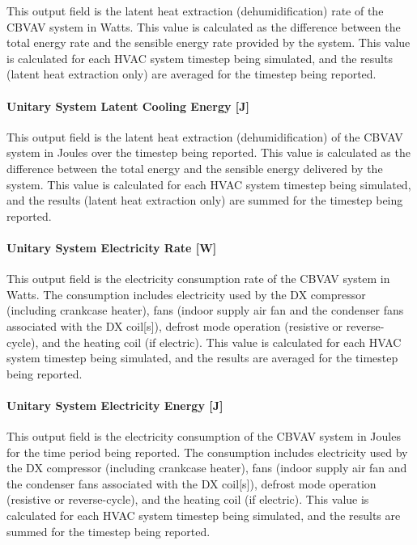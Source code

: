 This output field is the latent heat extraction (dehumidification) rate of the CBVAV system in Watts. This value is calculated as the difference between the total energy rate and the sensible energy rate provided by the system. This value is calculated for each HVAC system timestep being simulated, and the results (latent heat extraction only) are averaged for the timestep being reported.

\paragraph{Unitary System Latent Cooling Energy {[}J{]}}\label{unitary-system-latent-cooling-energy-j}

This output field is the latent heat extraction (dehumidification) of the CBVAV system in Joules over the timestep being reported. This value is calculated as the difference between the total energy and the sensible energy delivered by the system. This value is calculated for each HVAC system timestep being simulated, and the results (latent heat extraction only) are summed for the timestep being reported.

\paragraph{Unitary System Electricity Rate {[}W{]}}\label{unitary-system-electric-power-w-2}

This output field is the electricity consumption rate of the CBVAV system in Watts. The consumption includes electricity used by the DX compressor (including crankcase heater), fans (indoor supply air fan and the condenser fans associated with the DX coil{[}s{]}), defrost mode operation (resistive or reverse-cycle), and the heating coil (if electric). This value is calculated for each HVAC system timestep being simulated, and the results are averaged for the timestep being reported.

\paragraph{Unitary System Electricity Energy {[}J{]}}\label{unitary-system-electric-energy-j-2}

This output field is the electricity consumption of the CBVAV system in Joules for the time period being reported. The consumption includes electricity used by the DX compressor (including crankcase heater), fans (indoor supply air fan and the condenser fans associated with the DX coil{[}s{]}), defrost mode operation (resistive or reverse-cycle), and the heating coil (if electric). This value is calculated for each HVAC system timestep being simulated, and the results are summed for the timestep being reported.

